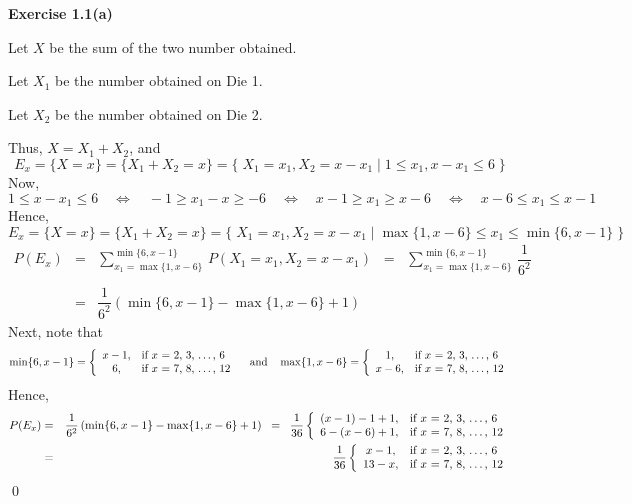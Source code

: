 
\noindent
\textbf{Exercise 1.1(a)}

Let $X$ be the sum of the two number obtained.

Let $X_{1}$ be the number obtained on Die 1.

Let $X_{2}$ be the number obtained on Die 2.

Thus, $X = X_{1} + X_{2}$, and
\begin{equation*}
E_{x}
=
\{X = x\} = \{X_{1} + X_{2} = x\}
=
\{\; X_{1} = x_{1}, X_{2} = x - x_{1} \;\vert\; 1 \leq x_{1}, x - x_{1} \leq 6 \;\}
\end{equation*}
Now,
\begin{equation*}
1 \leq x - x_{1} \leq 6
\quad\Longleftrightarrow\quad
-1 \geq x_{1} - x \geq -6
\quad\Longleftrightarrow\quad
x-1 \geq x_{1} \geq x-6
\quad\Longleftrightarrow\quad
x-6 \leq x_{1} \leq x-1
\end{equation*}
Hence,
\begin{equation*}
E_{x}
=
\{X = x\} = \{X_{1} + X_{2} = x\}
=
\{\; X_{1} = x_{1}, X_{2} = x - x_{1}
\;\vert\;
\max\{1,x-6\} \leq x_{1} \leq \min\{6,x-1\} 
\;\}
\end{equation*}
\begin{eqnarray*}
P(E_{x})
& = &
\sum_{x_{1}=\max\{1,x-6\}}^{\min\{6,x-1\}}\,P(X_{1}=x_{1},X_{2}=x-x_{1})
\;\; = \;\;
\sum_{x_{1}=\max\{1,x-6\}}^{\min\{6,x-1\}}\,\dfrac{1}{6^{2}} \\
& & \\
& = &
\dfrac{1}{6^{2}}\left( \min\{6,x-1\} - \max\{1,x-6\} + 1 \right)
\end{eqnarray*}
Next, note that
\begin{equation*}
\min\{6,x-1\}
=
\left\{\begin{array}{cl}
x - 1, & \textnormal{if $x$ = 2, 3, \ldots,  6} \\
6,     & \textnormal{if $x$ = 7, 8, \ldots, 12} \\
\end{array}\right.
\quad\textnormal{and}\quad
\max\{1,x-6\}
=
\left\{\begin{array}{cl}
1,     & \textnormal{if $x$ = 2, 3, \ldots,  6} \\
x - 6, & \textnormal{if $x$ = 7, 8, \ldots, 12} \\
\end{array}\right.
\end{equation*}
Hence,
\begin{eqnarray*}
P(E_{x})
& = &
\dfrac{1}{6^{2}}\left( \min\{6,x-1\} - \max\{1,x-6\} + 1 \right) 
\;\; = \;\;
\dfrac{1}{36}\left\{\begin{array}{cl}
(x-1) - 1 + 1  , & \textnormal{if $x$ = 2, 3, \ldots,  6} \\
6 - (x - 6) + 1, & \textnormal{if $x$ = 7, 8, \ldots, 12} \\
\end{array}\right.
\\
& = &
\dfrac{1}{36}\left\{\begin{array}{cl}
 x - 1, & \textnormal{if $x$ = 2, 3, \ldots,  6} \\
13 - x, & \textnormal{if $x$ = 7, 8, \ldots, 12} \\
\end{array}\right.
\end{eqnarray*}
\qed
